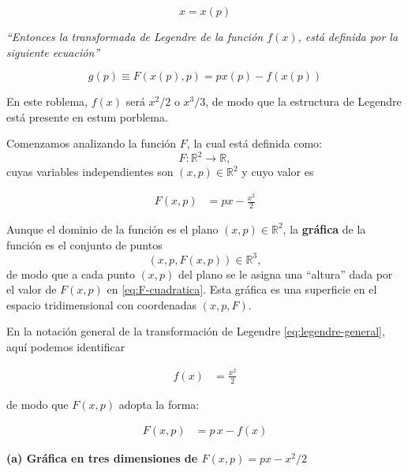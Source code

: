 \documentclass{article}
\begin{document}
\[x=x(p)\]

\emph{``Entonces la transformada de Legendre de la función  $f(x)$, está definida por la siguiente ecuación''}

\[ g(p) \equiv F(x(p),p) = px(p) - f(x(p)) \]


En este roblema, \(f(x)\) será \(x^{2}/2\) o \(x^{3}/3\), de modo que la estructura de
Legendre está presente en estum porblema.



\vspace{0.5cm}

Comenzamos analizando la función \(F\), la cual está definida como:
\[
F:\mathbb{R}^{2}\longrightarrow \mathbb{R},
\]
cuyas variables independientes son \((x,p)\in\mathbb{R}^{2}\) y cuyo valor es

\begin{equation}
\begin{split}
F(x,p) &= px - \frac{x^{2}}{2}
\end{split}\label{eq:F-cuadratica}
\end{equation}

Aunque el dominio de la función es el plano \((x,p)\in\mathbb{R}^{2}\), la \textbf{gráfica} de la función es el conjunto de puntos
\[
(x,p,F(x,p)) \in \mathbb{R}^{3},
\]
de modo que a cada punto \((x,p)\) del plano se le asigna una “altura” dada por el valor de \(F(x,p)\) en \eqref{eq:F-cuadratica}.  
Esta gráfica es una superficie en el espacio tridimensional con coordenadas \((x,p,F)\).

En la notación general de la transformación de Legendre \eqref{eq:legendre-general}, aquí podemos identificar

\begin{equation}
\begin{split}
f(x) &= \frac{x^{2}}{2}
\end{split}\label{eq:f-cuadratica}
\end{equation}

de modo que \(F(x,p)\) adopta la forma:

\begin{equation}
\begin{split}
F(x,p) &= p\,x - f(x)
\end{split}\label{eq:F-cuadratica-legendre}
\end{equation}



\vspace{0.3cm}
\textbf{(a) Gráfica en tres dimensiones de $F(x,p) = px - x^{2}/2$}
\end{document}
